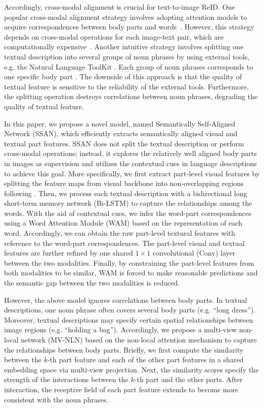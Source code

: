 \documentclass[journal]{IEEEtran}
\begin{document}
Accordingly, cross-modal alignment is crucial for text-to-image ReID.
One popular cross-modal alignment strategy involves adopting attention models to acquire correspondences between body parts and words~\cite{li2017person,li2017identity,chen2018improving}.
However, this strategy depends on cross-modal operations for each image-text pair, which are computationally expensive~\cite{qu2020context}.
Another intuitive strategy involves splitting one textual description into several groups of noun phrases by using external tools, e.g. the Natural Language ToolKit \cite{loper2002nltk}.
Each group of noun phrases corresponds to one specific body part \cite{jing2020pose,niu2020improving,wang2020vitaa}.
The downside of this approach is that the quality of textual feature is sensitive to the reliability of the external tools.
Furthermore, the splitting operation destroys correlations between noun phrases, degrading the quality of textual feature.

In this paper, we propose a novel model, named Semantically Self-Aligned Network (SSAN), which efficiently extracts semantically aligned visual and textual part features.
SSAN does not split the textual description or perform cross-modal operations;
instead, it explores the relatively well aligned body parts in images as supervision and utilizes the contextual cues in language descriptions to achieve this goal.
More specifically, we first extract part-level visual features by splitting the feature maps from visual backbone into non-overlapping regions following \cite{sun2018beyond}.
Then, we process each textual description with a bidirectional long short-term memory network (Bi-LSTM) \cite{hochreiter1997long} to capture the relationships among the words.
With the aid of contextual cues, we infer the word-part correspondences using a Word Attention Module (WAM) based on the representation of each word.
Accordingly, we can obtain the raw part-level textural features with reference to the word-part correspondences.
The part-level visual and textual features are further refined by one shared $1\times1$ convolutional (Conv) layer between the two modalities.
Finally, by constraining the part-level features from both modalities to be similar, WAM is forced to make reasonable predictions and the semantic gap between the two modalities is reduced.

However, the above model ignores correlations between body parts. In textual descriptions, one noun phrase often covers several body parts (e.g. ``long dress''). Moreover, textual descriptions may specify certain spatial relationships between image regions (e.g. ``holding a bag''). Accordingly, we propose a multi-view non-local network (MV-NLN) based on the non-local attention mechanism \cite{wang2018non} to capture the relationships between body parts. Briefly, we first compute the similarity between the $k$-th part feature and each of the other part features in a shared embedding space via multi-view projection. Next, the similarity scores specify the strength of the interactions between the $k$-th part and the other parts. After interaction, the receptive field of each part feature extends to become more consistent with the noun phrases.
\end{document}
